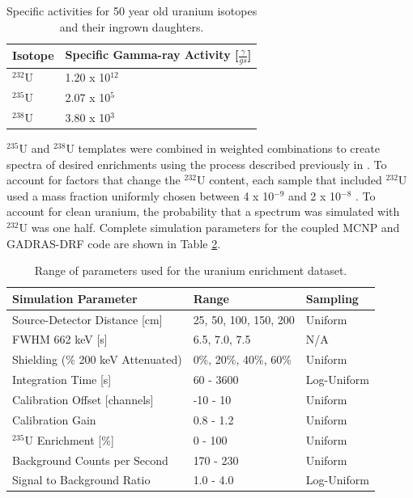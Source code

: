 \begin{table}[H]
\centering
\caption{Specific activities for 50 year old uranium isotopes and their ingrown daughters.}
\label{table:specific_activities_radsrc}
\begin{tabular}{ll}
\hline
\textbf{Isotope} & \textbf{Specific Gamma-ray Activity [$\frac{\gamma}{g s}$]} \\ \hline
$^{232}$U & 1.20 x 10$^{12}$ \\ 
$^{235}$U & 2.07 x 10$^{5}$ \\
$^{238}$U & 3.80 x 10$^{3}$ \\ \hline
\end{tabular}
\end{table}
$^{235}$U and $^{238}$U templates were combined in weighted combinations to create spectra of desired enrichments using the process described previously in . To account for factors that change the $^{232}$U content, each sample that included $^{232}$U used a mass fraction uniformly chosen between 4 x 10$^{-9}$ and 2 x 10$^{-8}$ \cite{Peurrung2019}. To account for clean uranium, the probability that a spectrum was simulated with $^{232}$U was one half. Complete simulation parameters for the coupled MCNP and GADRAS-DRF code are shown in Table \ref{table:hyperparameter_dataset_full_parameters_enrichment}.

\begin{table}[H]
\centering
\caption{Range of parameters used for the uranium enrichment dataset.}
\label{table:hyperparameter_dataset_full_parameters_enrichment}
\begin{tabular}{lll}
\hline
\textbf{Simulation Parameter} & \textbf{Range} & \textbf{Sampling} \\ \hline
Source-Detector Distance [cm] & 25, 50, 100, 150, 200 & Uniform \\ %
FWHM 662 keV [s] & 6.5, 7.0, 7.5 & N/A \\ %
Shielding (\% 200 keV Attenuated) & 0\%, 20\%, 40\%, 60\% & Uniform \\ %
Integration Time [s] & 60 - 3600 & Log-Uniform \\ %
Calibration Offset [channels] & -10 - 10 & Uniform \\ %
Calibration Gain & 0.8 - 1.2 & Uniform \\ %
$^{235}$U Enrichment [\%] & 0 - 100 & Uniform \\ %
Background Counts per Second & 170 - 230 & Uniform \\ %
Signal to Background Ratio & 1.0 - 4.0 & Log-Uniform \\ \hline
\end{tabular}
\end{table}


